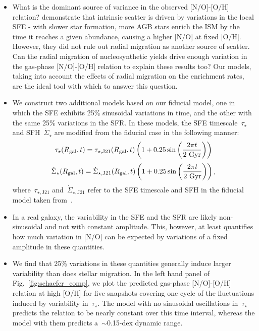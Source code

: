 \documentclass[ms.tex]{subfiles}
\begin{document}
\begin{itemize} 
	\item What is the dominant source of variance in the observed [N/O]-[O/H] 
	relation? 
	\citet{Schaefer2020} demonstrate that intrinsic scatter is driven by 
	variations in the local SFE - with slower star formation, more AGB stars 
	enrich the ISM by the time it reaches a given abundance, causing a higher 
	[N/O] at fixed [O/H]. 
	However, they did not rule out radial migration as another source of 
	scatter. 
	Can the radial migration of nucleosynthetic yields drive enough variation 
	in the gas-phase [N/O]-[O/H] relation to explain these results too? 
	Our models, taking into account the effects of radial migration on the 
	enrichment rates, are the ideal tool with which to answer this question. 

	\item We construct two additional models based on our fiducial model, one 
	in which the SFE exhibits 25\% sinusoidal variations in time, and the other 
	with the same 25\% variations in the SFR. 
	In these models, the SFE timescale~$\tau_\star$ and SFH~$\dot{\Sigma}_\star$ 
	are modified from the fiducial case in the following manner: 
	\begin{equation} 
	\tau_\star(R_\text{gal}, t) = \tau_{\star,\text{J21}}(R_\text{gal}, t)\left(1 + 0.25\sin 
	\left(\frac{2\pi t}{2\text{ Gyr}}\right)\right)
	\end{equation} 
	\begin{equation} 
	\dot{\Sigma}_\star(R_\text{gal}, t) = \dot{\Sigma}_{\star,\text{J21}}(R_\text{gal}, t) 
	\left(1 + 0.25\sin \left(\frac{2\pi t}{2\text{ Gyr}}\right)\right), 
	\end{equation} 
	where~$\tau_{\star,\text{J21}}$ and~$\dot{\Sigma}_{\star,\text{J21}}$ refer 
	to the SFE timescale and SFH in the fiducial model taken 
	from~\citet{Johnson2021}. 

	\item In a real galaxy, the variability in the SFE and the SFR are likely 
	non-sinusoidal and not with constant amplitude. 
	This, however, at least quantifies how much variation in [N/O] can be 
	expected by variations of a fixed amplitude in these quantities. 

	\item We find that 25\% variations in these quantities generally induce 
	larger variability than does stellar migration. 
	In the left hand panel of Fig.~\ref{fig:schaefer_comp}, we plot the 
	predicted gas-phase [N/O]-[O/H] relation at high [O/H] for five snapshots 
	covering one cycle of the fluctuations induced by variability 
	in~$\tau_\star$. 
	The model with no sinusoidal oscillations in~$\tau_\star$ predicts the 
	relation to be nearly constant over this time interval, whereas the model 
	with them predicts a~$\sim$0.15-dex dynamic range. 


\end{itemize}
\end{document}

